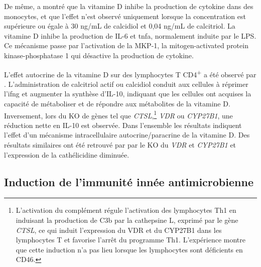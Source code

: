 \documentclass[
  a4paper,
  DIV=11,
  numbers=noendperiod,
  listof=totoc]{scrreprt}
\begin{document}
De même, \textcite{Zhang.2012} a montré que la vitamine D inhibe la
production de cytokine dans des monocytes, et que l'effet n'est observé
uniquement lorsque la concentration est supérieure ou égale à 30 ng/mL
de calcidiol et 0,04 ng/mL de calcitriol. La vitamine D inhibe la
production de \ac{IL}-6 et \ac{tnfa}, normalement induite par le
\ac{LPS}. Ce mécanisme passe par l'activation de la MKP-1, la
mitogen-activated protein kinase-phosphatase 1 qui désactive la
production de cytokine.

L'effet autocrine de la vitamine D sur des lymphocytes T
CD4\textsuperscript{+} a été observé par \textcite{Chauss.2022}.
L'administration de calcitriol actif ou calcidiol conduit aux cellules à
réprimer l'\ac{ifng} et augmenter la synthèse d'\ac{IL-10}, indiquant
que les cellules ont acquises la capacité de métaboliser et de répondre
aux métabolites de la vitamine D. Inversement, lors du \ac{KO} de gènes
tel que \emph{CTSL},\footnote{L'activation du complément régule
  l'activation des lymphocytes \ac{Th1} en induisant la production de
  C3b par la cathepsine L, exprimé par le gène \emph{CTSL}, ce qui
  induit l'expression du \ac{VDR} et du \ac{CYP27B1} dans les
  lymphocytes T et favorise l'arrêt du programme \ac{Th1}. L'expérience
  montre que cette induction n'a pas lieu lorsque les lymphocytes sont
  déficients en \ac{CD}46.} \emph{VDR} ou \emph{CYP27B1}, une réduction
nette en \ac{IL-10} est observée. Dans l'ensemble les résultats
indiquent l'effet d'un mécanisme intracellulaire autocrine/paracrine de
la vitamine D. Des résultats similaires ont été retrouvé par
\textcite{Adams.2009} par le \ac{KO} du \emph{VDR} et \emph{CYP27B1} et
l'expression de la cathélicidine diminuée.

\subsection{Induction de l'immunité innée
antimicrobienne}\label{induction-de-limmunituxe9-innuxe9e-antimicrobienne}
\end{document}
